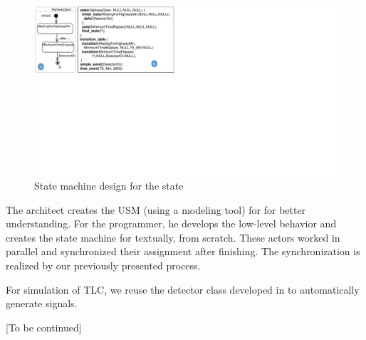 \begin{figure}
	\centering
	\includegraphics[clip, trim=0.0cm 11.5cm 18.1cm 0cm, width=\columnwidth]{figures/highwayopenalternatives}
	\caption{State machine design for the  state} 
	\label{fig:highwayopenalternatives}
\end{figure}

The architect creates the USM (using a modeling tool) for  
for better understanding.
For the programmer, he 
develops the low-level behavior and creates the state machine for  textually, from scratch.
These actors worked in parallel and synchronized their assignment after finishing.
The synchronization is realized by our previously presented process.

For simulation of TLC, we reuse the detector class developed in \cite{farmroadexample} to automatically generate  signals. 

[To be continued]



